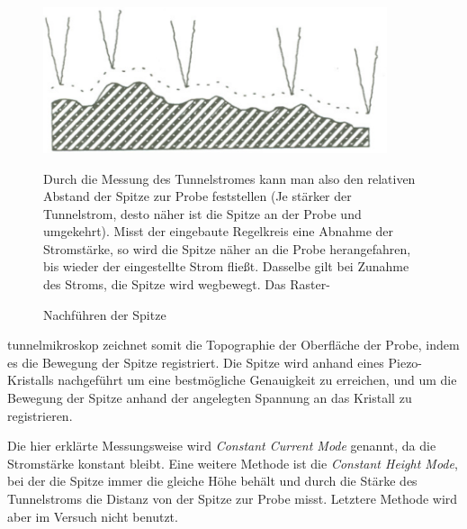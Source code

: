 \begin{figure}[H]
\begin{minipage}{0.5\textwidth}
	\includegraphics[width=0.9\textwidth]{Bilder/CCM.png}
	\centering \caption{Nachführen der Spitze}
\end{minipage}
\begin{minipage}{0.5\textwidth}
Durch die Messung des Tunnelstromes kann man also den relativen Abstand der Spitze zur Probe feststellen (Je stärker der Tunnelstrom, desto näher ist die Spitze an der Probe und umgekehrt). Misst  der eingebaute Regelkreis eine Abnahme der Stromstärke, so wird die Spitze näher an die Probe herangefahren, bis wieder der eingestel\-lte Strom fließt. Dasselbe gilt bei Zunahme des Stroms, die Spitze wird wegbewegt. Das Raster-
\end{minipage}
\end{figure}
tunnelmikroskop zeichnet somit die Topographie der Oberfläche der Probe, indem es die Bewegung der Spitze registriert. Die Spitze wird anhand eines Piezo-Kristalls nachgeführt um eine bestmögliche Genauigkeit zu erreichen, und um die Bewegung der Spitze anhand der angelegten Spannung an das Kristall zu registrieren.

Die hier erklärte Messungsweise wird \emph{Constant Current Mode} genannt, da die Stromstärke konstant bleibt. Eine weitere Methode ist die \emph{Constant Height Mode}, bei der die Spitze immer die gleiche Höhe behält und durch die Stärke des Tunnelstroms die Distanz von der Spitze zur Probe misst. Letztere Methode wird aber im Versuch nicht benutzt.

